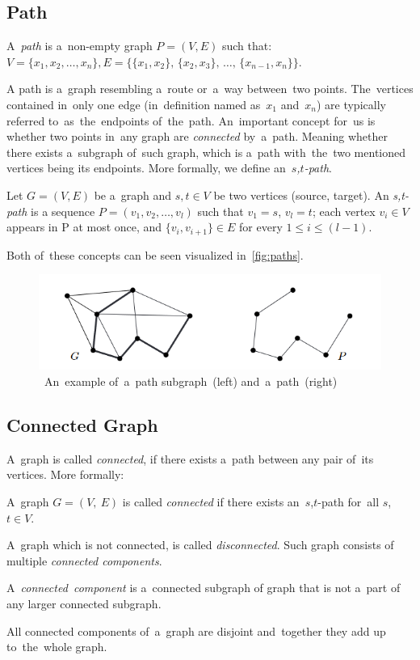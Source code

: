 \subsection{Path}
\begin{definition}[Path]
    A~\emph{path} is a~non-empty graph $P = (V, E)$ such that: \\ $V = \{x_1, x_2, \dots, x_n\}, E = \{\{x_1, x_2\},\,\{x_2, x_3\},\,\dots,\,\{x_{n-1}, x_n\}\}$.
\end{definition}
A path is a~graph resembling a~route or~a~way between~two points. The~vertices contained in~only one edge (in~definition named as~$x_1$ and~$x_n$) are typically referred to~as~the~endpoints of~the~path.
An~important concept for~us is whether two points in~any graph are \textit{connected} by~a~path. Meaning whether there exists a~subgraph of~such graph, which is a~path with~the~two mentioned vertices being its endpoints. More formally, we define an~\emph{$s$,$t$-path}.
\begin{definition}[$s$,$t$-path]
    Let $G = (V, E)$ be a~graph and $s,t \in V$ be two vertices (source, target). An \emph{s,t-path} is a sequence $P = (v_1, v_2, \dots, v_l)$ such that $v_1 = s$, $v_l = t$; each vertex $v_i \in V$ appears in P at most once, and $\{v_i, v_{i + 1}\} \in E$ for every $1 \leq i \leq (l - 1)$.
\end{definition}
Both of~these concepts can be seen visualized in~\autoref{fig:paths}.

\begin{figure}
    \centering
    \includegraphics[width=1.0\linewidth]{path_example.png}
    \caption[An~example of~a~path subgraph and~a~path]{~An~example of~a~path subgraph~(left) and~a~path~(right)~\cite{Diestel}}
    \label{fig:paths}
\end{figure}

\subsection{Connected Graph}
A~graph is called \textit{connected}, if there exists a~path between any pair of~its vertices. More formally:
\begin{definition}
    A~graph $G = (V,~E)$ is called \emph{connected} if there exists an~$s$,$t$-path for~all $s$,$t \in V$.
\end{definition}
A~graph which is not connected, is called \textit{disconnected}. Such graph consists of multiple \textit{connected components}.
\begin{definition}
    A~\emph{connected~component} is a~connected subgraph of graph that is not a~part of any larger connected subgraph.
\end{definition}
All connected components of~a~graph are disjoint and~together they add up to~the~whole graph.
